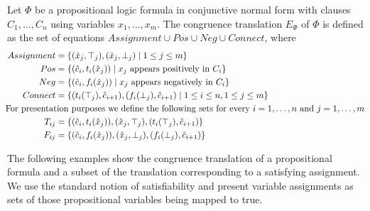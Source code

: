 \begin{definition}

Let $\Phi$ be a propositional logic formula in conjunctive normal form with clauses $C_1,\ldots,C_n$ using variables $x_1,\ldots,x_m$.
The congruence translation $E_{\Phi}$ of $\Phi$ is defined as the set of equations $Assignment \cup Pos \cup Neg \cup Connect$, where
\begin{align*}
	Assignment &= \{ (\hat{x}_j,\top_j), (\hat{x}_j,\bot_j) \mid 1 \leq j \leq m\} \\
	Pos &= \{ (\hat{c}_i, t_i(\hat{x}_j)) \mid x_j \text{ appears positively in } C_i\} \\
	Neg &= \{ (\hat{c}_i, f_i(\hat{x}_j)) \mid x_j \text{ appears negatively in } C_i\} \\
	Connect &= \{ (t_i(\top_j),\hat{c}_{i+1}),(f_i(\bot_j), \hat{c}_{i+1}) \mid 1 \leq i \leq n, 1 \leq j \leq m\} \\
&\hspace{-2cm}\text{For presentation purposes we define the following sets for every $i = 1,\ldots, n$ and $j = 1,\ldots, m$}\\
T_{ij} &= \{(\hat{c}_i, t_i(\hat{x}_j)), (\hat{x}_j,\top_j), (t_i(\top_j),\hat{c}_{i+1})\} \\
F_{ij} &= \{(\hat{c}_i, f_i(\hat{x}_j)), (\hat{x}_j,\bot_j), (f_i(\bot_j),\hat{c}_{i+1})\}
\end{align*}

\end{definition}

The following examples show the congruence translation of a propositional formula and a subset of the translation corresponding to a satisfying assignment.
We use the standard notion of satisfiability and present variable assignments as sets of those propositional variables being mapped to true.

